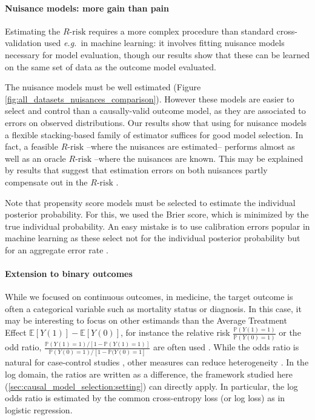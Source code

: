 \documentclass[french,12pt,twoside,a4paper]{book}
\begin{document}
\paragraph{Nuisance models: more gain than pain}
%
Estimating the $R\text{-risk}$ requires a more complex procedure than
standard cross-validation used \emph{e.g.}~in machine learning: it involves
fitting nuisance models necessary for model evaluation, though our
results show that these can be learned on the same set of data
as the outcome model evaluated.

The nuisance models must be well estimated (Figure
\ref{fig:all_datasets_nuisances_comparison}). However these models are
easier to select and control than a causally-valid outcome model,
as they are associated to errors on
observed distributions. Our results show that using for nuisance models
a flexible stacking-based family of estimator suffices for good model selection.
%
In fact, a feasible $R\text{-risk}$ --where the nuisances
are estimated-- performs almost as well as an oracle $R\text{-risk}$ --where the
nuisances are known. This may be explained by
results that suggest that estimation errors on both
nuisances partly compensate out in the
$R\text{-risk}$ \citep{daniel2018double,kennedy2020optimal,nie_quasioracle_2017,chernozhukov_double_2018,zivich2021machine,naimi2021challenges}.

Note that propensity score models must be selected to estimate
the individual posterior probability. For this, we used the Brier score,
which is minimized by the true individual probability. An easy mistake is to
use calibration errors popular in machine learning
\citep{platt_probabilistic_1999,zadrozny_obtaining_2001,niculescu-mizil_predicting_2005,minderer_revisiting_2021}
as these select not for the individual posterior probability but for an
aggregate error rate \citep{perez2022beyond}.


\paragraph{Extension to binary outcomes}
While we focused on continuous outcomes, in medicine, the target outcome is
often a categorical variable such as mortality status or diagnosis. In this
case, it may be interesting to focus on other estimands than the Average
Treatment Effect $\mathbb{E}[Y(1)] -\mathbb{E}[Y(0)] $, for instance the
relative risk $\frac{\mathbb P(Y(1) = 1)}{\mathbb P(Y(0) = 1)}$ or the odd
ratio, $\frac{\mathbb P(Y(1) = 1) / [1 - \mathbb P(Y(1) =1)]}{\mathbb P(Y(0) =
  1) / [1 - \mathbb P(Y(0) = 1]}$ are often used \citep{austin2017estimating}.
While the odds ratio is natural for case-control studies \citep{rothman2008case},
other measures can reduce heterogeneity \citep{colnet2023risk}. In the log
domain, the ratios are written as a difference, the framework studied here
(\autoref{sec:causal_model_selection:setting}) can directly apply. In
particular, the log odds ratio is estimated by the common cross-entropy loss (or
log loss) as in logistic regression.
\end{document}
